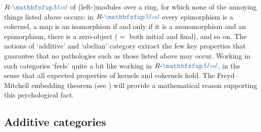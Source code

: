 $R\text{-}\categ{Mod}$ of (left-)modules over a ring, for which none
of the annoying things listed above occurs: in $R\text{-}\categ{Mod}$
every epimorphism is a cokernel, a map is an isomorphism if and only
if it is a monomorphism and an epimorphism, there is a zero-object
($=$ both initial and final), and so on.  The notions of `additive'
and `abelian' category extract the few key properties that guarantee
that no pathologies such as those listed above may occur. Working in
such categories `feels' quite a bit like working in
$R\text{-}\categ{Mod}$, in the sense that all expected properties of
kernels and cokernels hold. The Freyd--Mitchell embedding theorem (see
) will provide a mathematical
reason supporting this psychological fact.

\subsection{Additive categories}
\label{subsec:homol:additive-categories}

